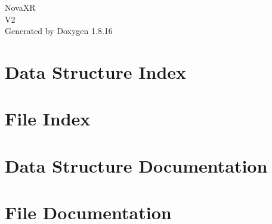\let\mypdfximage\pdfximage\def\pdfximage{\immediate\mypdfximage}\documentclass[twoside]{book}
\newcommand{\+}{\discretionary{\mbox{\scriptsize$\hookleftarrow$}}{}{}}
\newcommand{\clearemptydoublepage}{%
  \newpage{\pagestyle{empty}\cleardoublepage}%
}
\begin{document}
\hypersetup{pageanchor=false,
             bookmarksnumbered=true,
             pdfencoding=unicode
            }
\begin{titlepage}
\vspace*{7cm}
\begin{center}%
{\Large Nova\+XR \\[1ex]\large V2 }\\
\vspace*{1cm}
{\large Generated by Doxygen 1.8.16}\\
\end{center}
\end{titlepage}
\clearemptydoublepage
{}
\tableofcontents
\clearemptydoublepage
{}
\hypersetup{pageanchor=true}

\chapter{Data Structure Index}

\chapter{File Index}

\chapter{Data Structure Documentation}












\chapter{File Documentation}

































\backmatter
\newpage
{}
\clearemptydoublepage
{}
\printindex
\end{document}

